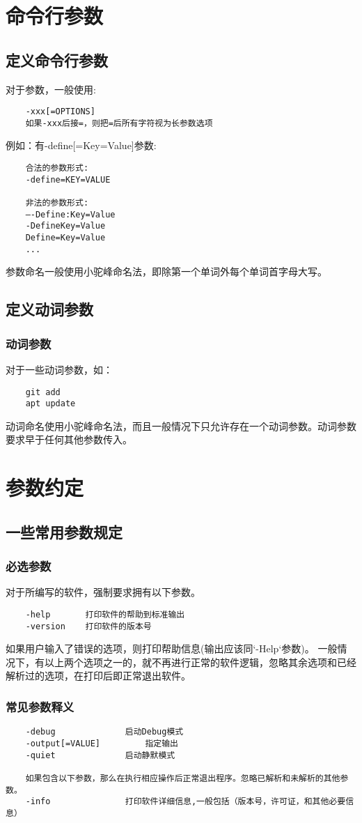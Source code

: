 \chapter{命令行参数}
\section{定义命令行参数}

对于参数，一般使用:
\begin{lstlisting}
	-xxx[=OPTIONS]
	如果-xxx后接=，则把=后所有字符视为长参数选项	
\end{lstlisting}

例如：有-define[=Key=Value]参数:
\begin{lstlisting}
	合法的参数形式:
	-define=KEY=VALUE
	
	非法的参数形式:
	—-Define:Key=Value
	-DefineKey=Value
	Define=Key=Value
	...
\end{lstlisting}
参数命名一般使用小驼峰命名法，即除第一个单词外每个单词首字母大写。



\section{定义动词参数}
\subsection{动词参数}
对于一些动词参数，如：
\begin{lstlisting}
	git add
	apt update
\end{lstlisting}
动词命名使用小驼峰命名法，而且一般情况下只允许存在一个动词参数。动词参数要求早于任何其他参数传入。


\chapter{参数约定}

\section{一些常用参数规定}

\subsection{必选参数}

对于所编写的软件，强制要求拥有以下参数。
\label{_PARAM_HELP_RULE_}
\begin{lstlisting}
	-help		打印软件的帮助到标准输出
	-version	打印软件的版本号
\end{lstlisting}
如果用户输入了错误的选项，则打印帮助信息(输出应该同`-Help`参数)。
一般情况下，有以上两个选项之一的，就不再进行正常的软件逻辑，忽略其余选项和已经解析过的选项，在打印后即正常退出软件。


\subsection{常见参数释义}
\begin{lstlisting}
	-debug				启动Debug模式
	-output[=VALUE]			指定输出	
	-quiet				启动静默模式
	
	如果包含以下参数，那么在执行相应操作后正常退出程序。忽略已解析和未解析的其他参数。
	-info 				打印软件详细信息,一般包括（版本号，许可证，和其他必要信息）
\end{lstlisting}
